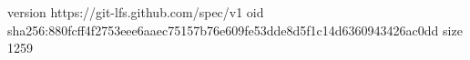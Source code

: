 version https://git-lfs.github.com/spec/v1
oid sha256:880fcff4f2753eee6aaec75157b76e609fe53dde8d5f1c14d6360943426ac0dd
size 1259
